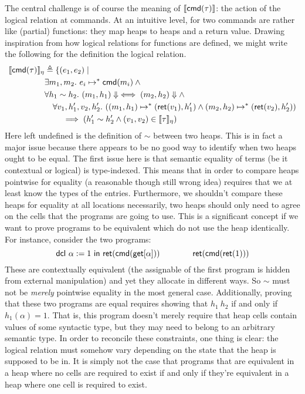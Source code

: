 The central challenge is of course the meaning of $\llbracket \mathsf{cmd}(\tau) \rrbracket$:
the action of the logical relation at commands. At an intuitive level,
for two commands are rather like (partial) functions: they map heaps to heaps
and a return value. Drawing inspiration from how logical relations for
functions are defined, we might write the following for the definition
the logical relation.
\begin{align*}
  \llbracket \mathsf{cmd}(\tau) \rrbracket_\eta& \triangleq \{(e_1, e_2) \mid\\
  &\exists m_1, m_2.\ e_i \mapsto^* \mathsf{cmd}(m_i) \land{}\\
  &\forall h_1 \sim h_2.
  \ (m_1, h_1) \Downarrow \iff (m_2, h_2) \Downarrow \land{}\\
  &\quad \forall v_1, h_1', v_2, h_2'.
  \ ((m_1, h_1) \mapsto^* (\mathsf{ret}(v_1), h_1') \land (m_2, h_2) \mapsto^* (\mathsf{ret}(v_2), h_2'))\\
  &\qquad \implies (h_1' \sim h_2' \land (v_1, v_2) \in \llbracket \tau \rrbracket_\eta)
\end{align*}
Here left undefined is the definition of $\sim$ between two
heaps. This is in fact a major issue because there appears to be no
good way to identify when two heaps ought to be equal. The first issue
here is that semantic equality of terms (be it contextual or logical)
is type-indexed. This means that in order to compare heaps pointwise
for equality (a reasonable though still wrong idea) requires that we
at least know the types of the entries. Furthermore, we shouldn't
compare these heaps for equality at all locations necessarily, two
heaps should only need to agree on the cells that the programs are
going to use. This is a significant concept if we want to prove
programs to be equivalent which do not use the heap identically. For
instance, consider the two programs:
\[
  \mathsf{dcl}\ \alpha := 1\ \mathsf{in}\ \mathsf{ret}(\mathsf{cmd}(\mathsf{get}[\alpha])) \qquad\qquad
  \mathsf{ret}(\mathsf{cmd}(\mathsf{ret}(1)))
\]
These are contextually equivalent (the assignable of the first program
is hidden from external manipulation) and yet they allocate in
different ways. So $\sim$ must not be \emph{merely} pointwise equality
in the most general case. Additionally, proving that these two
programs are equal requires showing that $h_1 ~ h_2$ if and only if
$h_1(\alpha) = 1$. That is, this program doesn't merely require that
heap cells contain values of some syntactic type, but they may need to
belong to an arbitrary semantic type. In order to reconcile these
constraints, one thing is clear: the logical relation must somehow
vary depending on the state that the heap is supposed to be in. It is
simply not the case that programs that are equivalent in a heap where
no cells are required to exist if and only if they're equivalent in a
heap where one cell is required to exist.

